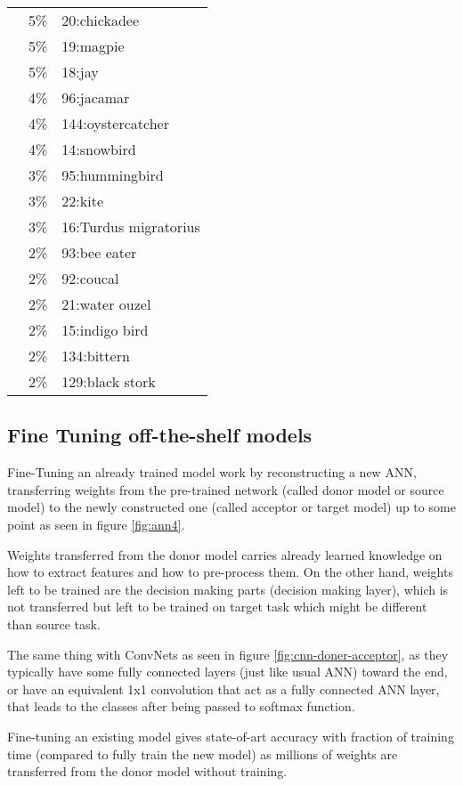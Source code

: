 \begin{table*}
\begin{adjustwidth}{-2in}{-2in}
\begin{tabular}{@{}lrl@{}}
 & 5\% & 20:chickadee \\
 & 5\% & 19:magpie \\
 & 5\% & 18:jay \\
 & 4\% & 96:jacamar \\
 & 4\% & 144:oystercatcher \\
 & 4\% & 14:snowbird \\
 & 3\% & 95:hummingbird \\
 & 3\% & 22:kite \\
 & 3\% & 16:Turdus migratorius \\
 & 2\% & 93:bee eater \\
 & 2\% & 92:coucal \\
 & 2\% & 21:water ouzel \\
 & 2\% & 15:indigo bird \\
 & 2\% & 134:bittern \\
 & 2\% & 129:black stork \\
\bottomrule
\end{tabular}
\end{adjustwidth}


\end{table*}

\subsection{Fine Tuning off-the-shelf models}

Fine-Tuning an already trained model work by reconstructing a new ANN,
transferring weights from the pre-trained network (called donor model or source model)
to the newly constructed one (called acceptor or target model)
up to some point as seen in figure \ref{fig:ann4}.

Weights transferred from the donor model carries already learned knowledge on how to extract features and
how to pre-process them\autocite{oquab2014learning}.
On the other hand, weights left to be trained are the decision making parts (decision making layer),
which is not transferred but left to be trained on target task which might be different than source task.

The same thing with ConvNets as seen in figure \ref{fig:cnn-doner-acceptor},
as they typically have some fully connected layers (just like usual ANN) toward the end,
or have an equivalent 1x1 convolution that act as a fully connected ANN layer,
that leads to the classes after being passed to softmax function.

Fine-tuning an existing model gives state-of-art accuracy\autocite{ouyang2016factors}
with fraction of training time (compared to fully train the new model)
as millions of weights are transferred from the donor model without training.


